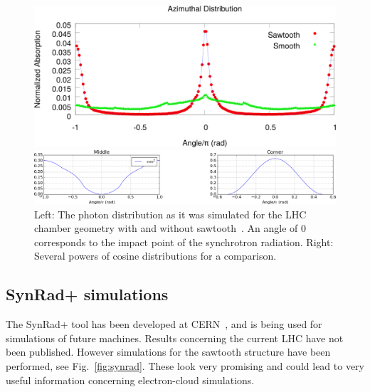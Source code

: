 \begin{figure}[tbh]
    \centering
    \begin{minipage}[c]{0.47\textwidth}
        \includegraphics[width=\textwidth]{../ss/photon_distribution_guillermo.png}
    \end{minipage}
    \hspace{0.5cm}
    \begin{minipage}[c]{0.47\textwidth}
        \includegraphics[width=\textwidth]{../plots/cosine_power.png}
    \end{minipage}
    \caption{Left: The photon distribution as it was simulated for the LHC chamber geometry with and without sawtooth~\cite{guillermo}.
    An angle of 0 corresponds to the impact point of the synchrotron radiation.
    Right: Several powers of cosine distributions for a comparison.}
    \label{fig:guillermo}
\end{figure}

\subsection{SynRad+ simulations}

The SynRad+ tool has been developed at CERN~\cite{synrad+}, and is being used for simulations of future machines.
Results concerning the current LHC have not been published.
However simulations for the sawtooth structure have been performed, see Fig.~\ref{fig:synrad}.
These look very promising and could lead to very useful information concerning electron-cloud simulations.

